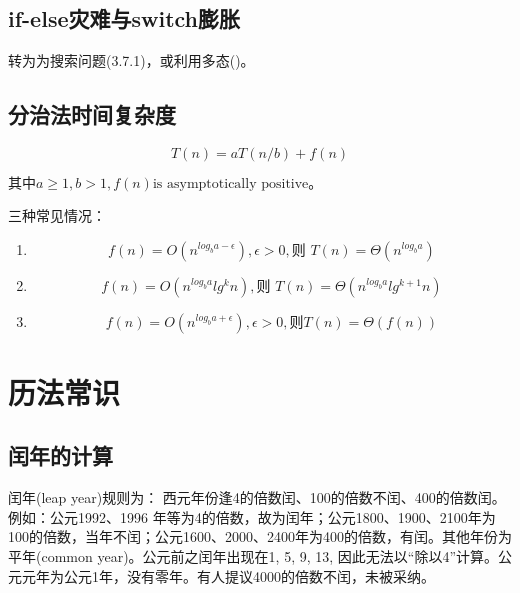 \subsection{if-else灾难与switch膨胀}
转为为搜索问题(\cite{pp}3.7.1)，或利用多态(\cite{refractor})。

\subsection{分治法时间复杂度}
\begin{displaymath}
    T(n)=aT(n/b)+f(n)
\end{displaymath}

\begin{math}
    \textrm{其中} a \ge 1, b > 1, f(n) \textrm{is asymptotically positive}。
\end{math}

三种常见情况：
\begin{enumerate}
    \item 
\begin{displaymath}
    f(n)=O(n^{log_{b}a-\epsilon}), \epsilon>0, \textrm{则 }T(n)=\Theta(n^{log_{b}a})
\end{displaymath}

    \item 
\begin{displaymath}
    f(n)=O(n^{log_{b}a}lg^{k}n), \textrm{则 }T(n)=\Theta(n^{log_{b}a}lg^{k+1}n)
\end{displaymath}

    \item 
\begin{displaymath}
    f(n)=O(n^{log_{b}a+\epsilon}), \epsilon>0, \textrm{则}T(n)=\Theta(f(n))
\end{displaymath}

\end{enumerate}

\label{divide_complex}


\section{历法常识}

\subsection{闰年的计算}
\label{subsec:leapyear}
闰年(leap year)规则为： 西元年份逢4的倍数闰、100的倍数不闰、400的倍数闰。例如：公元1992、1996 年等为4的倍数，故为闰年；公元1800、1900、2100年为100的倍数，当年不闰；公元1600、2000、2400年为400的倍数，有闰。其他年份为平年(common year)。公元前之闰年出现在1, 5, 9, 13, 因此无法以“除以4”计算。公元元年为公元1年，没有零年。有人提议4000的倍数不闰，未被采纳。


